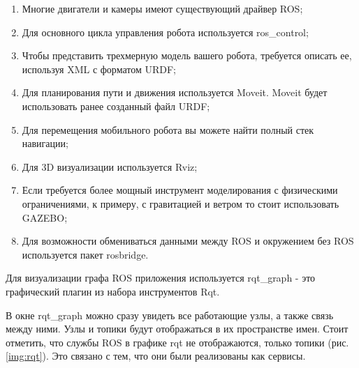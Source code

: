 \begin{enumerate}
	\item Многие двигатели и камеры имеют существующий драйвер ROS;
	\item Для основного цикла управления робота используется ros\_control;
	\item Чтобы представить трехмерную модель вашего робота, требуется описать ее, используя XML с форматом URDF;
	\item Для планирования пути и движения используется Moveit. Moveit будет использовать ранее созданный  файл URDF;
	\item Для перемещения мобильного робота вы можете найти полный стек навигации;
	\item Для 3D визуализации используется Rviz;
	\item Если требуется более мощный инструмент моделирования с физическими ограничениями, к примеру, с гравитацией и ветром то стоит использовать GAZEBO;
	\item Для возможности обмениваться данными между ROS и окружением без ROS используется пакет rosbridge. 
\end{enumerate}

Для визуализации графа ROS приложения используется rqt\_graph - это графический плагин из набора инструментов Rqt.

В окне rqt\_graph можно сразу увидеть все работающие узлы, а также связь между ними. Узлы и топики будут отображаться в их пространстве имен. Стоит отметить, что службы ROS в графике rqt не отображаются, только топики (рис. \ref{img:rqt}). Это связано с тем, что они были реализованы как сервисы.

